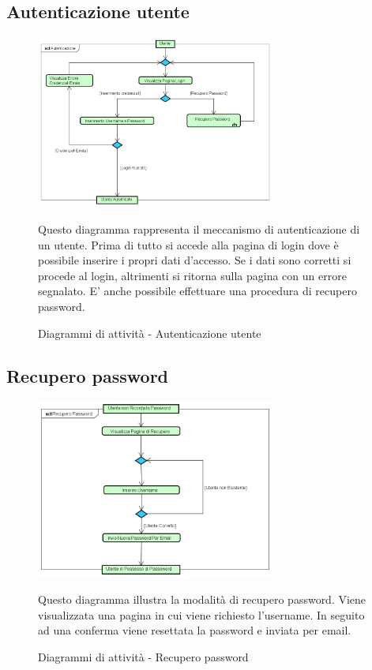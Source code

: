{	\subsection{Autenticazione utente} {
		\begin{figure}[ht]
			\centering
			\includegraphics[width=0.7\textwidth]{img/autenticazioneUtente}
			\caption{Diagrammi di attività - Autenticazione utente}
			Questo diagramma rappresenta il meccanismo di autenticazione di un utente. Prima di tutto si accede alla pagina di login dove è possibile inserire i propri dati d'accesso. Se i dati sono corretti si procede al login, altrimenti si ritorna sulla pagina con un errore segnalato. E' anche possibile effettuare una procedura di recupero password. 
		\end{figure}
	}
	\subsection{Recupero password}{
		\begin{figure}[ht]
			\centering
			\includegraphics[width=0.7\textwidth]{img/recuperoPassword}
			\caption{Diagrammi di attività - Recupero password}
			Questo diagramma illustra la modalità di recupero password. Viene visualizzata una pagina in cui viene richiesto l'username. In seguito ad una conferma viene resettata la password e inviata per email.
		\end{figure}	
	}
}
